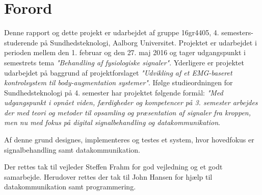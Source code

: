 \chapter*{Forord}
Denne rapport og dette projekt er udarbejdet af gruppe 16gr4405, 4. semesters-studerende på Sundhedsteknologi, Aalborg Universitet. Projektet er udarbejdet i perioden mellem den 1. februar og den 27. maj 2016 og tager udgangspunkt i semestrets tema \textit{"Behandling af fysiologiske signaler"}. Yderligere er projektet udarbejdet på baggrund af projektforslaget \textit{"Udvikling af et EMG-baseret kontrolsystem til body-augmentation systemer"}. Ifølge studieordningen for Sundhedsteknologi på 4. semester har projektet følgende formål: \textit{"Med udgangspunkt i opnået viden, færdigheder og kompetencer på 3. semester arbejdes der med teori og metoder til opsamling og præsentation af signaler fra kroppen, men nu med fokus på digital signalbehandling og datakommunikation}. \citep{aalborguniversitet2014}

Af denne grund designes, implementeres og testes et system, hvor hovedfokus er signalbehandling samt datakommunikation. 

Der rettes tak til vejleder Steffen Frahm for god vejledning og et godt samarbejde. Herudover rettes der tak til John Hansen for hjælp til datakommunikation samt programmering. 